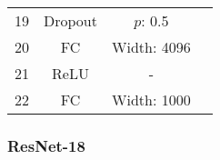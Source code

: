 \documentclass[10pt,twocolumn,letterpaper]{article}
\begin{document}
\begin{table}[ht]
\begin{tabular}{|l|c|c|r}
        \multirow{1}{0.5cm}{19} & Dropout & $p$: 0.5\\
        \multirow{1}{0.5cm}{20} & FC & Width: 4096\\
        \multirow{1}{0.5cm}{21} & ReLU & -\\
        
        \multirow{1}{0.5cm}{22} & FC & Width: 1000\\
        
        \hline
        

        \hline
        \bottomrule
    \end{tabular}
    \label{table:alex_chart}
    \vspace{-2mm}
\end{table}

\subsubsection{ResNet-18}
\end{document}

